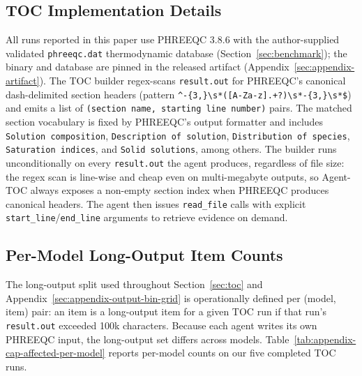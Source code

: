 \documentclass{article}
\begin{document}
\subsection{TOC Implementation Details}
\label{sec:appendix-toc-impl}

All runs reported in this paper use PHREEQC 3.8.6 with the author-supplied validated \texttt{phreeqc.dat} thermodynamic database (Section~\ref{sec:benchmark}); the binary and database are pinned in the released artifact (Appendix~\ref{sec:appendix-artifact}). The TOC builder regex-scans \texttt{result.out} for PHREEQC's canonical dash-delimited section headers (pattern \texttt{\^{}-\{3,\}\textbackslash{}s*([A-Za-z].+?)\textbackslash{}s*-\{3,\}\textbackslash{}s*\$}) and emits a list of \texttt{(section name, starting line number)} pairs. The matched section vocabulary is fixed by PHREEQC's output formatter and includes \texttt{Solution composition}, \texttt{Description of solution}, \texttt{Distribution of species}, \texttt{Saturation indices}, and \texttt{Solid solutions}, among others. The builder runs unconditionally on every \texttt{result.out} the agent produces, regardless of file size: the regex scan is line-wise and cheap even on multi-megabyte outputs, so Agent-TOC always exposes a non-empty section index when PHREEQC produces canonical headers. The agent then issues \texttt{read\_file} calls with explicit \texttt{start\_line}/\texttt{end\_line} arguments to retrieve evidence on demand.

\subsection{Per-Model Long-Output Item Counts}
\label{sec:appendix-cap-affected-per-model}

The long-output split used throughout Section~\ref{sec:toc} and Appendix~\ref{sec:appendix-output-bin-grid} is operationally defined per (model, item) pair: an item is a long-output item for a given TOC run if that run's \texttt{result.out} exceeded 100k characters. Because each agent writes its own PHREEQC input, the long-output set differs across models. Table~\ref{tab:appendix-cap-affected-per-model} reports per-model counts on our five completed TOC runs.
\end{document}
